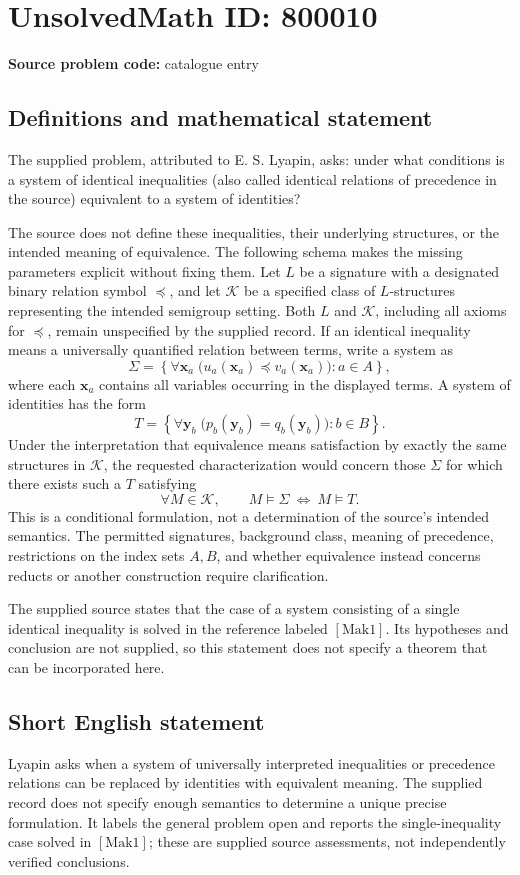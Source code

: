 \documentclass[11pt]{article}
\begin{document}
\section*{UnsolvedMath ID: 800010}
\textbf{Source problem code:} catalogue entry
\subsection{Definitions and mathematical statement}
The supplied problem, attributed to E. S. Lyapin, asks: under what conditions is a system of identical inequalities (also called identical relations of precedence in the source) equivalent to a system of identities?

The source does not define these inequalities, their underlying structures, or the intended meaning of equivalence. The following schema makes the missing parameters explicit without fixing them. Let \(L\) be a signature with a designated binary relation symbol \(\preceq\), and let \(\mathcal K\) be a specified class of \(L\)-structures representing the intended semigroup setting. Both \(L\) and \(\mathcal K\), including all axioms for \(\preceq\), remain unspecified by the supplied record. If an identical inequality means a universally quantified relation between terms, write a system as
\[
\Sigma=\left\{\forall\mathbf x_a\;\bigl(u_a(\mathbf x_a)\preceq v_a(\mathbf x_a)\bigr):a\in A\right\},
\]
where each \(\mathbf x_a\) contains all variables occurring in the displayed terms. A system of identities has the form
\[
T=\left\{\forall\mathbf y_b\;\bigl(p_b(\mathbf y_b)=q_b(\mathbf y_b)\bigr):b\in B\right\}.
\]
Under the interpretation that equivalence means satisfaction by exactly the same structures in \(\mathcal K\), the requested characterization would concern those \(\Sigma\) for which there exists such a \(T\) satisfying
\[
\forall M\in\mathcal K,\qquad M\models\Sigma\ \Longleftrightarrow\ M\models T.
\]
This is a conditional formulation, not a determination of the source's intended semantics. The permitted signatures, background class, meaning of precedence, restrictions on the index sets \(A,B\), and whether equivalence instead concerns reducts or another construction require clarification.

The supplied source states that the case of a system consisting of a single identical inequality is solved in the reference labeled \([\mathrm{Mak1}]\). Its hypotheses and conclusion are not supplied, so this statement does not specify a theorem that can be incorporated here.
\subsection{Short English statement}
Lyapin asks when a system of universally interpreted inequalities or precedence relations can be replaced by identities with equivalent meaning. The supplied record does not specify enough semantics to determine a unique precise formulation. It labels the general problem open and reports the single-inequality case solved in \([\mathrm{Mak1}]\); these are supplied source assessments, not independently verified conclusions.
\end{document}
